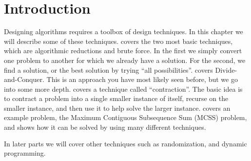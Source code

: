 \chapter{Introduction}
\label{ch:design::intro}

\begin{gram}
  Designing algorithms requires a toolbox of design techniques.   In
  this chapter we will describe some of these techniques.  
    covers the two most basic techniques,
  which are algorithmic reductions and brute force.   In the first we
  simply convert one problem to another for which we already
  have a solution.   For the second, we find a solution, or the best
  solution by trying ``all possibilities''.    
  covers Divide-and-Conquer.     This is an approach you have most
  likely seen before, but we go into some more depth.
   covers a technique called
  ``contraction''.   The basic idea is to contract a problem into a
  single smaller instance of itself, recurse on the smaller instance,
  and then use it to help solve the larger instance.
   covers an example problem, the Maximum Contiguous
  Subsequence Sum (MCSS) problem, and shows how it can be solved by
  using many different techniques.
  
  In later parts we will cover other techniques such as randomization,
  and dynamic programming.
\end{gram}
